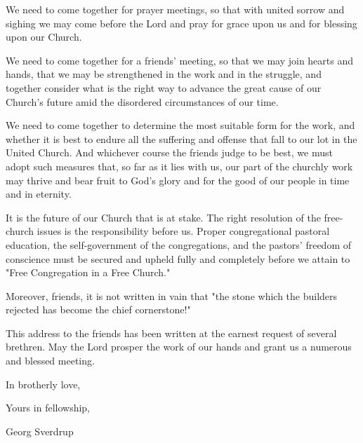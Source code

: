 We need to come together for prayer meetings, so that with united sorrow and sighing we may come before the Lord and pray for grace upon us and for blessing upon our Church.

We need to come together for a friends’ meeting, so that we may join hearts and hands, that we may be strengthened in the work and in the struggle, and together consider what is the right way to advance the great cause of our Church’s future amid the disordered circumstances of our time.

We need to come together to determine the most suitable form for the work, and whether it is best to endure all the suffering and offense that fall to our lot in the United Church. And whichever course the friends judge to be best, we must adopt such measures that, so far as it lies with us, our part of the churchly work may thrive and bear fruit to God’s glory and for the good of our people in time and in eternity.

It is the future of our Church that is at stake. The right resolution of the free-church issues is the responsibility before us. Proper congregational pastoral education, the self-government of the congregations, and the pastors’ freedom of conscience must be secured and upheld fully and completely before we attain to "Free Congregation in a Free Church."

Moreover, friends, it is not written in vain that "the stone which the builders rejected has become the chief cornerstone!"

This address to the friends has been written at the earnest request of several brethren. May the Lord prosper the work of our hands and grant us a numerous and blessed meeting.

In brotherly love,

Yours in fellowship,

Georg Sverdrup